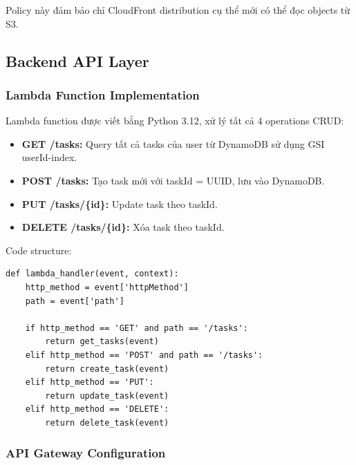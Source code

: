 Policy này đảm bảo chỉ CloudFront distribution cụ thể mới có thể đọc objects từ S3.

\subsection{Backend API Layer}
\label{ssec:backend_impl}

\subsubsection{Lambda Function Implementation}

Lambda function được viết bằng Python 3.12, xử lý tất cả 4 operations CRUD:

\begin{itemize}
    \item \textbf{GET /tasks:} Query tất cả tasks của user từ DynamoDB sử dụng GSI userId-index.
    \item \textbf{POST /tasks:} Tạo task mới với taskId = UUID, lưu vào DynamoDB.
    \item \textbf{PUT /tasks/\{id\}:} Update task theo taskId.
    \item \textbf{DELETE /tasks/\{id\}:} Xóa task theo taskId.
\end{itemize}

Code structure:

\begin{verbatim}
def lambda_handler(event, context):
    http_method = event['httpMethod']
    path = event['path']
    
    if http_method == 'GET' and path == '/tasks':
        return get_tasks(event)
    elif http_method == 'POST' and path == '/tasks':
        return create_task(event)
    elif http_method == 'PUT':
        return update_task(event)
    elif http_method == 'DELETE':
        return delete_task(event)
\end{verbatim}

\subsubsection{API Gateway Configuration}

